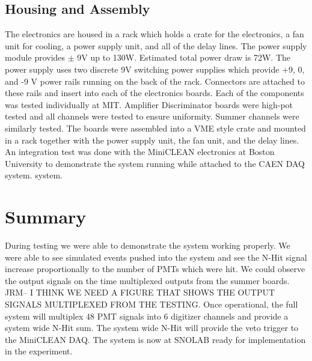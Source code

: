 \documentclass{JINST}
\begin{document}
\subsection{Housing and Assembly}
\label{sec:Housing}
%
The electronics are housed in a rack which holds a crate for the
electronics, a fan unit for cooling, a power supply unit, and all of
the delay lines.  The power supply module provides $\pm$ 9V up to
130W.  Estimated total power draw is 72W.  The power supply uses two
discrete 9V switching power supplies which provide +9, 0, and -9 V
power rails running on the back of the rack.  Connectors are attached
to these rails and insert into each of the electronics boards.  Each
of the components was tested individually at MIT.  Amplifier
Discriminator boards were high-pot tested and all channels were tested
to ensure uniformity.  Summer channels were similarly tested.  The
boards were assembled into a VME style crate and mounted in a rack
together with the power supply unit, the fan unit, and the delay
lines.  An integration test was done with the MiniCLEAN electronics
at Boston University to
demonstrate the system running while attached to the CAEN DAQ system.
system.

\section{Summary}
\label{Summary}
%
During testing we were able to demonstrate the system working
properly.  We were able to see simulated events pushed into the system
and see the N-Hit signal increase proportionally to the number of PMTs
which were hit.  We could observe the output signals on the time
multiplexed outputs from the summer boards.  JRM-- I THINK WE NEED A FIGURE THAT SHOWS THE OUTPUT SIGNALS MULTIPLEXED FROM THE TESTING.  Once operational, the
full system will multiplex 48 PMT signals into 6 digitizer channels
and provide a system wide N-Hit sum.  The system wide N-Hit will
provide the veto trigger to the MiniCLEAN DAQ.  The system is now at
SNOLAB ready for implementation in the experiment.
\end{document}
